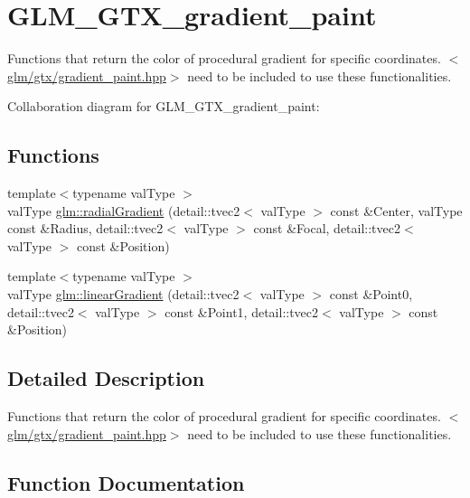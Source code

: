 \hypertarget{group__gtx__gradient__paint}{}\section{G\+L\+M\+\_\+\+G\+T\+X\+\_\+gradient\+\_\+paint}
\label{group__gtx__gradient__paint}


Functions that return the color of procedural gradient for specific coordinates. $<$\hyperlink{gradient__paint_8hpp}{glm/gtx/gradient\+\_\+paint.\+hpp}$>$ need to be included to use these functionalities.  


Collaboration diagram for G\+L\+M\+\_\+\+G\+T\+X\+\_\+gradient\+\_\+paint\+:
\subsection*{Functions}
\begin{DoxyCompactItemize}
\item 
{\footnotesize template$<$typename val\+Type $>$ }\\val\+Type \hyperlink{group__gtx__gradient__paint_ga0b76f577ea60dbefd769356b77c8192b}{glm\+::radial\+Gradient} (detail\+::tvec2$<$ val\+Type $>$ const \&Center, val\+Type const \&Radius, detail\+::tvec2$<$ val\+Type $>$ const \&Focal, detail\+::tvec2$<$ val\+Type $>$ const \&Position)
\item 
{\footnotesize template$<$typename val\+Type $>$ }\\val\+Type \hyperlink{group__gtx__gradient__paint_gac1242f716beadc6ee8404ddfea0b6674}{glm\+::linear\+Gradient} (detail\+::tvec2$<$ val\+Type $>$ const \&Point0, detail\+::tvec2$<$ val\+Type $>$ const \&Point1, detail\+::tvec2$<$ val\+Type $>$ const \&Position)
\end{DoxyCompactItemize}


\subsection{Detailed Description}
Functions that return the color of procedural gradient for specific coordinates. $<$\hyperlink{gradient__paint_8hpp}{glm/gtx/gradient\+\_\+paint.\+hpp}$>$ need to be included to use these functionalities. 



\subsection{Function Documentation}
\hypertarget{group__gtx__gradient__paint_gac1242f716beadc6ee8404ddfea0b6674}{}
